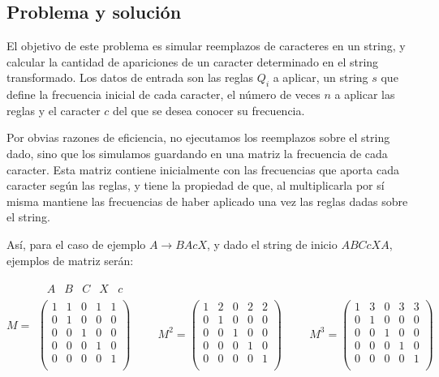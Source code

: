 \subsection*{Problema y solución}

El objetivo de este problema es simular reemplazos de caracteres en un
string, y calcular la cantidad de apariciones de un caracter determinado
en el string transformado. Los datos de entrada son las reglas $Q_i$ a aplicar,
un string $s$ que define la frecuencia inicial de cada caracter, el número de
veces $n$ a aplicar las reglas y el caracter $c$ del que se desea conocer su
frecuencia.

Por obvias razones de eficiencia, no ejecutamos los reemplazos sobre el
string dado, sino que los simulamos guardando en una matriz la frecuencia
de cada caracter. Esta matriz contiene inicialmente con las frecuencias
que aporta cada caracter según las reglas, y tiene la propiedad de que,
al multiplicarla por sí misma mantiene las frecuencias de haber aplicado
una vez las reglas dadas sobre el string.

Así, para el caso de ejemplo $A \rightarrow BAcX$, y dado el string de inicio
$ABCcXA$, ejemplos de matriz serán:

$$M =
\begin{array}{l}
\begin{matrix}
	\ \ A & B & C & X & c
\end{matrix} \\
\left(
	\begin{array}{ccccc}
	1 & 1 & 0 & 1 & 1 \\
	0 & 1 & 0 & 0 & 0 \\
	0 & 0 & 1 & 0 & 0 \\
	0 & 0 & 0 & 1 & 0 \\
	0 & 0 & 0 & 0 & 1 \\
	\end{array}
\right)
\hspace{1cm}
M^2 = \left(
\begin{array}{ccccc}
1 & 2 & 0 & 2 & 2 \\
0 & 1 & 0 & 0 & 0 \\
0 & 0 & 1 & 0 & 0 \\
0 & 0 & 0 & 1 & 0 \\
0 & 0 & 0 & 0 & 1 \\
\end{array}
\right)
\hspace{1cm}
M^3 = \left(
\begin{array}{ccccc}
1 & 3 & 0 & 3 & 3 \\
0 & 1 & 0 & 0 & 0 \\
0 & 0 & 1 & 0 & 0 \\
0 & 0 & 0 & 1 & 0 \\
0 & 0 & 0 & 0 & 1 \\
\end{array}
\right)
\end{array}
$$

